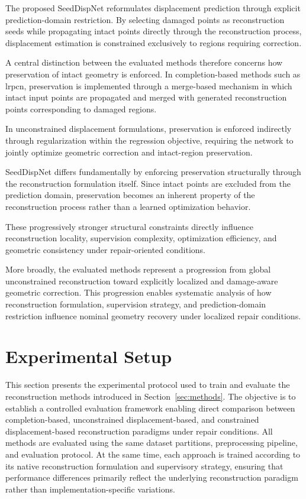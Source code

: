 The proposed SeedDispNet reformulates displacement prediction through explicit prediction-domain restriction. By selecting damaged points as reconstruction seeds while propagating intact points directly through the reconstruction process, displacement estimation is constrained exclusively to regions requiring correction.

A central distinction between the evaluated methods therefore concerns how preservation of intact geometry is enforced. In completion-based methods such as \ac{lrpcn}, preservation is implemented through a merge-based mechanism in which intact input points are propagated and merged with generated reconstruction points corresponding to damaged regions. 

In unconstrained displacement formulations, preservation is enforced indirectly through regularization within the regression objective, requiring the network to jointly optimize geometric correction and intact-region preservation.

SeedDispNet differs fundamentally by enforcing preservation structurally through the reconstruction formulation itself. Since intact points are excluded from the prediction domain, preservation becomes an inherent property of the reconstruction process rather than a learned optimization behavior.

These progressively stronger structural constraints directly influence reconstruction locality, supervision complexity, optimization efficiency, and geometric consistency under repair-oriented conditions.

More broadly, the evaluated methods represent a progression from global unconstrained reconstruction toward explicitly localized and damage-aware geometric correction. This progression enables systematic analysis of how reconstruction formulation, supervision strategy, and prediction-domain restriction influence nominal geometry recovery under localized repair conditions.

\section{Experimental Setup}
\label{sec:experimental_setup}

This section presents the experimental protocol used to train and evaluate the reconstruction methods introduced in Section~\ref{sec:methods}. The objective is to establish a controlled evaluation framework enabling direct comparison between completion-based, unconstrained displacement-based, and constrained displacement-based reconstruction paradigms under repair conditions. All methods are evaluated using the same dataset partitions, preprocessing pipeline, and evaluation protocol. At the same time, each approach is trained according to its native reconstruction formulation and supervisory strategy, ensuring that performance differences primarily reflect the underlying reconstruction paradigm rather than implementation-specific variations.

